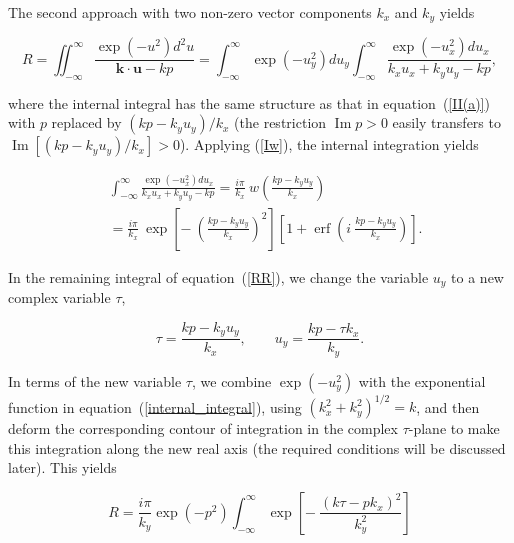 \documentclass[draft]{agujournal2019}
\renewcommand{\vec}{\mathbf}
\begin{document}
{The second approach with two non-zero vector components $k_{x}$ and $k_{y}$
yields
\begin{linenomath*}
\begin{equation}
R=\iint_{-\infty}^{\infty}\frac{\exp\left(  -u^{2}\right)  d^{2}u}{\vec
{k}\cdot\vec{u}-kp}=\int_{-\infty}^{\infty}\exp\left(  -u_{y}%
^{2}\right)  du_{y}\int_{-\infty}^{\infty}\frac{\exp\left(  -u_{x}%
^{2}\right)  du_{x}}{k_{x}u_{x}+k_{y}u_{y}-kp}, 
\label{RR}
\end{equation}
\end{linenomath*}
where the internal integral has the same structure as that in
equation~(\ref{II(a)}) with $p$ replaced by $(kp-k_{y}u_{y})/k_{x}$ (the restriction
$\operatorname{Im}p>0$ easily transfers to $\operatorname{Im}[(kp-k_{y}%
u_{y})/k_{x}]>0$). Applying (\ref{Iw}), the internal integration yields
\begin{linenomath*}
\begin{align}
&  \int_{-\infty}^{\infty}\frac{\exp\left(  -u_{x}^{2}\right)  du_{x}}%
{k_{x}u_{x}+k_{y}u_{y}-kp}=\frac{i\pi}{k_{x}}\ w\left(  \frac{kp-k_{y}u_{y}%
}{k_{x}}\right) \nonumber\\
&  =\frac{i\pi}{k_x}\ \exp\left[  -\ \left(  \frac{kp-k_{y}u_{y}}{k_{x}%
}\right)  ^{2}\right]  \left[  1+\operatorname{erf}\left(  i\ \frac
{kp-k_{y}u_{y}}{k_{x}}\right)  \right]  . 
\label{internal_integral}
\end{align}
\end{linenomath*}
In the remaining integral of equation~(\ref{RR}), we change the variable
$u_{y}$ to a new complex variable $\tau$,
\begin{linenomath*}
\begin{equation}
\tau=\frac{kp-k_{y}u_{y}}{k_{x}},\qquad u_{y}=\frac{kp-\tau k_{x}}{k_{y}}.
\label{u_y,tau}
\end{equation}
\end{linenomath*}
In terms of the new variable $\tau$, we combine $\exp\left(  -u_{y}%
^{2}\right)  $ with the exponential function in
equation~(\ref{internal_integral}), using $\left(  k_{x}^{2}+k_{y}^{2}\right)
^{1/2}=k$, and then deform the corresponding contour of integration in the
complex $\tau$-plane to make this integration along the new real axis (the
required conditions will be discussed later). This yields
\begin{linenomath*}
\begin{equation}
R=\frac{i\pi}{k_y}\exp\left(  -p^{2}\right)  \int_{-\infty}^{\infty}%
\exp\left[  -\ \frac{\left(  k\tau-pk_{x}\right)  ^{2}}{k_{y}^{2}}\right]

\end{equation}
\end{linenomath*}}
\end{document}
